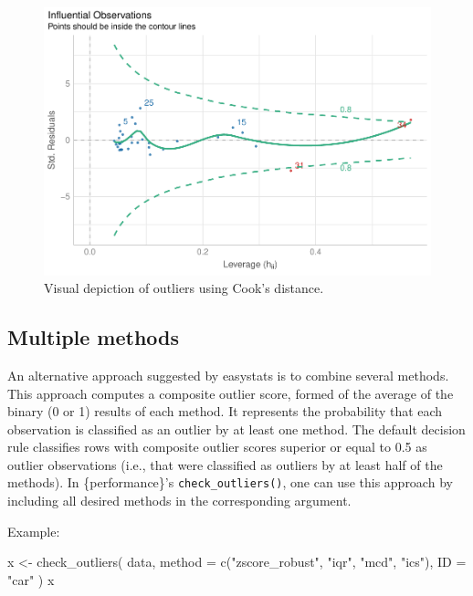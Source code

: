 \documentclass[
]{article}
\newenvironment{Shaded}{\begin{snugshade}}{\end{snugshade}}
\newcommand{\AttributeTok}[1]{\textcolor[rgb]{0.77,0.63,0.00}{#1}}
\newcommand{\FunctionTok}[1]{\textcolor[rgb]{0.00,0.00,0.00}{#1}}
\newcommand{\NormalTok}[1]{#1}
\newcommand{\OtherTok}[1]{\textcolor[rgb]{0.56,0.35,0.01}{#1}}
\newcommand{\StringTok}[1]{\textcolor[rgb]{0.31,0.60,0.02}{#1}}
\begin{document}
\begin{figure}
\includegraphics[width=1\linewidth]{paper_files/figure-latex/model-1} \caption{Visual depiction of outliers using Cook's distance.}\label{fig:model}
\end{figure}

\hypertarget{multiple-methods}{%
\subsection{Multiple methods}\label{multiple-methods}}

An alternative approach suggested by easystats is to combine several methods. This approach computes a composite outlier score, formed of the average of the binary (0 or 1) results of each method. It represents the probability that each observation is classified as an outlier by at least one method. The default decision rule classifies rows with composite outlier scores superior or equal to 0.5 as outlier observations (i.e., that were classified as outliers by at least half of the methods). In \{performance\}'s \texttt{check\_outliers()}, one can use this approach by including all desired methods in the corresponding argument.

Example:



\begin{Shaded}
\begin{Highlighting}[]
\NormalTok{x }\OtherTok{\textless{}{-}} \FunctionTok{check\_outliers}\NormalTok{(}
\NormalTok{  data,}
  \AttributeTok{method =} \FunctionTok{c}\NormalTok{(}\StringTok{"zscore\_robust"}\NormalTok{, }\StringTok{"iqr"}\NormalTok{, }\StringTok{"mcd"}\NormalTok{, }\StringTok{"ics"}\NormalTok{),}
  \AttributeTok{ID =} \StringTok{"car"}
\NormalTok{)}
\NormalTok{x}
\end{Highlighting}
\end{Shaded}
\end{document}
